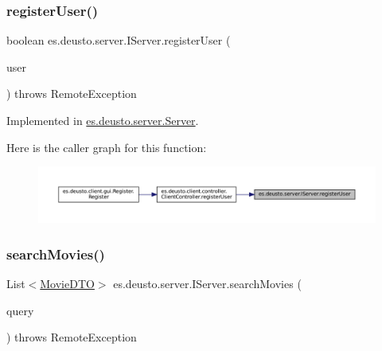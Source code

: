 \subsubsection{\texorpdfstring{registerUser()}{registerUser()}}
{\footnotesize\ttfamily boolean es.\+deusto.\+server.\+I\+Server.\+register\+User (\begin{DoxyParamCaption}\item[{\mbox{\hyperlink{classes_1_1deusto_1_1server_1_1data_1_1_user_details_d_t_o}{User\+Details\+D\+TO}}}]{user }\end{DoxyParamCaption}) throws Remote\+Exception}



Implemented in \mbox{\hyperlink{classes_1_1deusto_1_1server_1_1_server_a6a419bd82bce60f072b4c7f5a527abdc}{es.\+deusto.\+server.\+Server}}.

Here is the caller graph for this function\+:
\nopagebreak
\begin{figure}[H]
\begin{center}
\leavevmode
\includegraphics[width=350pt]{interfacees_1_1deusto_1_1server_1_1_i_server_a998e20655e760b135fab601a417aa5ae_icgraph}
\end{center}
\end{figure}
\mbox{\label{interfacees_1_1deusto_1_1server_1_1_i_server_a50b7dacdeb04d5f1ee3f3b59989ed117}} 
\subsubsection{\texorpdfstring{searchMovies()}{searchMovies()}}
{\footnotesize\ttfamily List$<$\mbox{\hyperlink{classes_1_1deusto_1_1server_1_1data_1_1_movie_d_t_o}{Movie\+D\+TO}}$>$ es.\+deusto.\+server.\+I\+Server.\+search\+Movies (\begin{DoxyParamCaption}\item[{String}]{query }\end{DoxyParamCaption}) throws Remote\+Exception}



